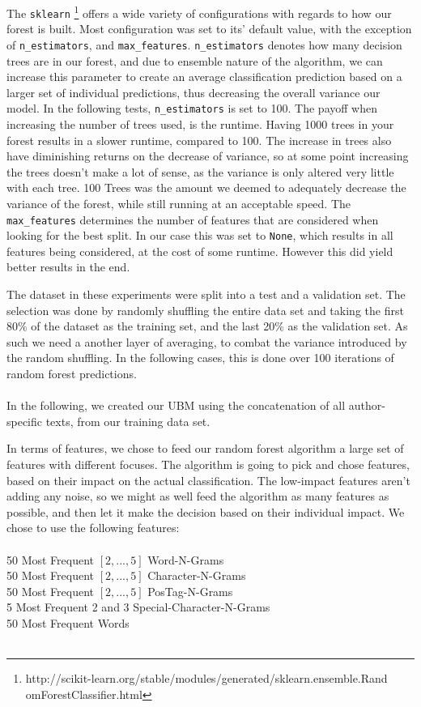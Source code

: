 The \texttt{sklearn}
\footnote{http://scikit-learn.org/stable/modules/generated/sklearn.ensemble.Rand
omForestClassifier.html} offers a wide variety of configurations with regards
to how our forest is built. Most configuration was set to its' default value,
with the exception of \texttt{n\_estimators}, and \texttt{max\_features}.
\texttt{n\_estimators} denotes how many decision trees are in our forest, and
due to ensemble nature of the algorithm, we can increase this parameter to
create an average classification prediction based on a larger set of individual
predictions, thus decreasing the overall variance our model. In the following
tests, \texttt{n\_estimators} is set to 100. The payoff when increasing
the number of trees used, is the runtime. Having 1000 trees in your forest
results in a slower runtime, compared to 100. The increase in trees also have
diminishing returns on the decrease of variance, so at some point increasing
the trees doesn't make a lot of sense, as the variance is only altered very
little with each tree. 100 Trees was the amount we deemed to adequately decrease
the variance of the forest, while still running at an acceptable speed. The
\texttt{max\_features} determines the number of features that are considered
when looking for the best split. In our case this was set to \texttt{None},
which results in all features being considered, at the cost of some runtime.
However this did yield better results in the end.

The dataset in these experiments were split into a test and a validation set.
The selection was done by randomly shuffling the entire data set and taking
the first 80\% of the dataset as the training set, and the last 20\% as the
validation set. 
As such we need a another layer of averaging, 
to combat the variance introduced by the random shuffling. 
In the following cases, this is done over 100 iterations 
of random forest predictions.\\\\

In the following, we created our \gls{UBM} using the concatenation of all
author-specific texts, from our training data set.

In terms of features, we chose to feed our random forest algorithm a large set of 
features with different focuses. The algorithm is going to pick and chose features, 
based on their impact on the actual classification. The low-impact features aren't 
adding any noise, so we might as well feed the algorithm as many features as possible, 
and then let it make the decision based on their individual impact.
We chose to use the following features:\\\\
50 Most Frequent $[2,...,5]$ Word-N-Grams\\
50 Most Frequent $[2,...,5]$ Character-N-Grams\\ 
50 Most Frequent $[2,...,5]$ PosTag-N-Grams\\
5 Most Frequent 2 and 3 Special-Character-N-Grams\\
50 Most Frequent Words\\\\


